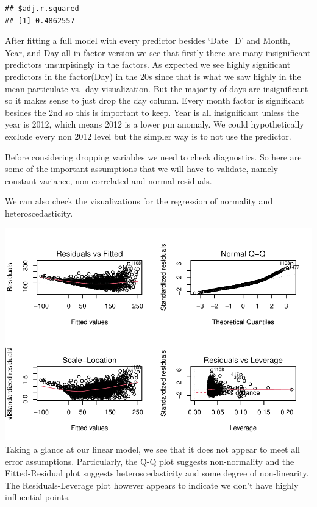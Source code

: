 \documentclass[
]{report}
\begin{document}
\begin{verbatim}
## $adj.r.squared
## [1] 0.4862557
\end{verbatim}

After fitting a full model with every predictor besides `Date\_D' and
Month, Year, and Day all in factor version we see that firstly there are
many insignificant predictors unsurpisingly in the factors. As expected
we see highly significant predictors in the factor(Day) in the 20s since
that is what we saw highly in the mean particulate vs.~day
visualization. But the majority of days are insignificant so it makes
sense to just drop the day column. Every month factor is significant
besides the 2nd so this is important to keep. Year is all insignificant
unless the year is 2012, which means 2012 is a lower pm anomaly. We
could hypothetically exclude every non 2012 level but the simpler way is
to not use the predictor.

Before considering dropping variables we need to check diagnostics. So
here are some of the important assumptions that we will have to
validate, namely constant variance, non correlated and normal residuals.

We can also check the visualizations for the regression of normality and
heteroscedasticity.

\includegraphics{Final_7_files/figure-latex/unnamed-chunk-9-1.pdf}
Taking a glance at our linear model, we see that it does not appear to
meet all error assumptions. Particularly, the Q-Q plot suggests
non-normality and the Fitted-Residual plot suggests heteroscedasticity
and some degree of non-linearity. The Residuals-Leverage plot however
appears to indicate we don't have highly influential points.
\end{document}
